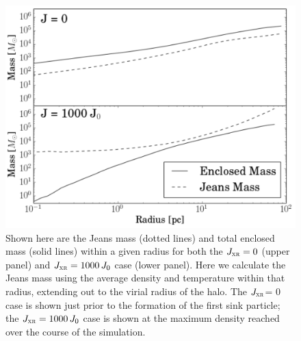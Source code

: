 \documentclass{thesis}
\newcommand{\jxr}{\ensuremath{J_{\textsc{xr}}}\xspace}
\begin{document}
\begin{figure}
  \begin{center}
    \includegraphics[width=\columnwidth]{figures/halo/blowout}   
    \caption{Shown
      here are the Jeans mass (dotted lines) and total enclosed mass
      (solid lines) within a given radius for  both the $\jxr = 0$ (upper panel) and $\jxr = 1000\,J_0$ case (lower panel). Here we calculate the Jeans mass using the average density and temperature within that radius, extending out to the virial radius of the halo.  The \jxr = 0 case is shown just prior to the formation of the first sink particle; the $\jxr = 1000\,J_0$ case is shown at the maximum density reached over the course of the simulation.}
    \label{suppressed}
  \end{center}
\end{figure}
\end{document}

